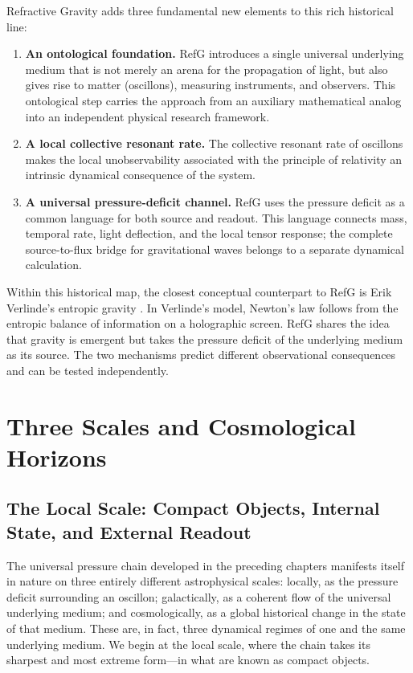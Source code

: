 \documentclass[11pt,a4paper]{article}
\begin{document}
Refractive Gravity adds three fundamental new elements to this rich historical line:

\begin{enumerate}
\item \textbf{An ontological foundation.} RefG introduces a single universal underlying medium that is not merely an arena for the propagation of light, but also gives rise to matter (oscillons), measuring instruments, and observers. This ontological step carries the approach from an auxiliary mathematical analog into an independent physical research framework.

\item \textbf{A local collective resonant rate.} The collective resonant rate of oscillons makes the local unobservability associated with the principle of relativity an intrinsic dynamical consequence of the system.

\item \textbf{A universal pressure-deficit channel.} RefG uses the pressure deficit as a common language for both source and readout. This language connects mass, temporal rate, light deflection, and the local tensor response; the complete source-to-flux bridge for gravitational waves belongs to a separate dynamical calculation.
\end{enumerate}

Within this historical map, the closest conceptual counterpart to RefG is Erik Verlinde's entropic gravity \citep{verlinde2011}. In Verlinde's model, Newton's law follows from the entropic balance of information on a holographic screen. RefG shares the idea that gravity is emergent but takes the pressure deficit of the underlying medium as its source. The two mechanisms predict different observational consequences and can be tested independently.

\section{Three Scales and Cosmological Horizons}

\subsection{The Local Scale: Compact Objects, Internal State, and External Readout}

The universal pressure chain developed in the preceding chapters manifests itself in nature on three entirely different astrophysical scales: locally, as the pressure deficit surrounding an oscillon; galactically, as a coherent flow of the universal underlying medium; and cosmologically, as a global historical change in the state of that medium. These are, in fact, three dynamical regimes of one and the same underlying medium. We begin at the local scale, where the chain takes its sharpest and most extreme form---in what are known as compact objects.
\end{document}
